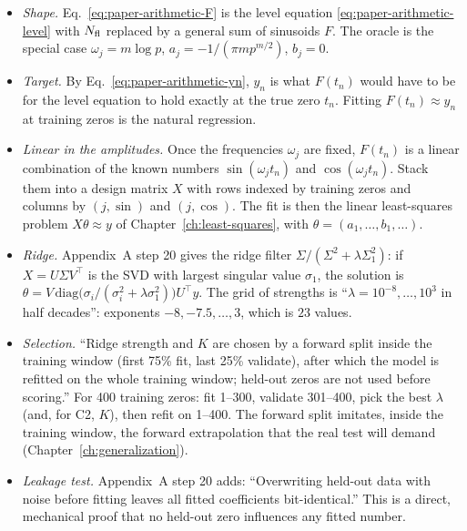 \begin{itemize}
\item \emph{Shape.} Eq.~\eqref{eq:paper-arithmetic-F} is the level equation \eqref{eq:paper-arithmetic-level} with $N_{\mathrm{fl}}$ replaced by a general sum of sinusoids $F$. The oracle is the special case $\omega_j=m\log p$, $a_j=-1/(\pi m p^{m/2})$, $b_j=0$.
\item \emph{Target.} By Eq.~\eqref{eq:paper-arithmetic-yn}, $y_n$ is what $F(t_n)$ would have to be for the level equation to hold exactly at the true zero $t_n$. Fitting $F(t_n)\approx y_n$ at training zeros is the natural regression.
\item \emph{Linear in the amplitudes.} Once the frequencies $\omega_j$ are fixed, $F(t_n)$ is a linear combination of the known numbers $\sin(\omega_jt_n)$ and $\cos(\omega_jt_n)$. Stack them into a design matrix $X$ with rows indexed by training zeros and columns by $(j,\sin)$ and $(j,\cos)$. The fit is then the linear least-squares problem $X\theta\approx y$ of Chapter~\ref{ch:least-squares}, with $\theta=(a_1,\dots,b_1,\dots)$.
\item \emph{Ridge.} Appendix~A step 20 gives the ridge filter $\Sigma/(\Sigma^2+\lambda\Sigma_1^2)$: if $X=U\Sigma V^\top$ is the SVD with largest singular value $\sigma_1$, the solution is $\theta=V\,\mathrm{diag}\bigl(\sigma_i/(\sigma_i^2+\lambda\sigma_1^2)\bigr)U^\top y$. The grid of strengths is ``$\lambda=10^{-8},\dots,10^{3}$ in half decades'': exponents $-8,-7.5,\dots,3$, which is $23$ values.
\item \emph{Selection.} ``Ridge strength and $K$ are chosen by a forward split inside the training window (first 75\% fit, last 25\% validate), after which the model is refitted on the whole training window; held-out zeros are not used before scoring.'' For 400 training zeros: fit 1--300, validate 301--400, pick the best $\lambda$ (and, for C2, $K$), then refit on 1--400. The forward split imitates, inside the training window, the forward extrapolation that the real test will demand (Chapter~\ref{ch:generalization}).
\item \emph{Leakage test.} Appendix~A step 20 adds: ``Overwriting held-out data with noise before fitting leaves all fitted coefficients bit-identical.'' This is a direct, mechanical proof that no held-out zero influences any fitted number.
\end{itemize}

